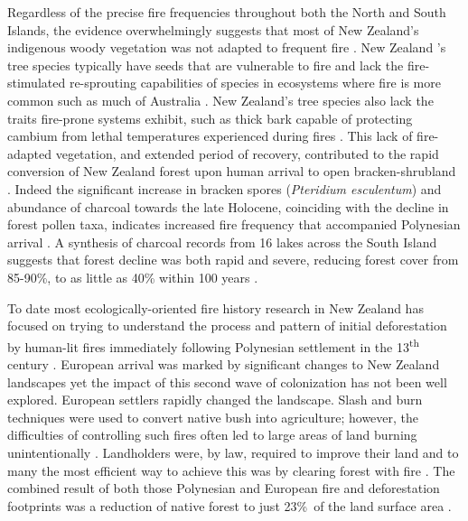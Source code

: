 \documentclass{article}
\begin{document}
Regardless of the precise fire frequencies throughout both the North and South Islands, the evidence overwhelmingly suggests that most of New Zealand's indigenous woody vegetation was not adapted to frequent fire \citep{Wilmshurst1996}. New Zealand 's tree species typically have seeds that are vulnerable to fire and lack the fire-stimulated re-sprouting capabilities of species in ecosystems where fire is more common such as much of Australia \citep{Perry2014}.  New Zealand's tree species also lack the traits fire-prone systems exhibit, such as thick bark capable of protecting cambium from lethal temperatures experienced during fires \citep{richardson2015functional}. This lack of fire-adapted vegetation, and extended period of recovery, contributed to the rapid conversion of New Zealand forest upon human arrival to open bracken-shrubland  \citep{McGlone1983}. Indeed the significant increase in bracken spores (\textit {Pteridium esculentum}) and abundance of charcoal towards the late Holocene, coinciding with the decline in forest pollen taxa, indicates increased fire frequency that accompanied Polynesian arrival \citep{McGlone1999}. A synthesis of charcoal records from 16 lakes across the South Island suggests that forest decline was both rapid and severe, reducing forest cover from 85-90\%, to as little as 40\% within 100 years \citep{McWethy2009a,mcwethy2014high}. 

To date most ecologically-oriented fire history research in New Zealand has focused on trying to understand the process and pattern of initial deforestation by human-lit fires immediately following Polynesian settlement in the 13\textsuperscript{th} century \citep { Perry2012a,Wilmshurst1996,McGlone1999,Wilmshurst2004,Wilmshurst2005,McWethy2009a}. European arrival was marked by significant changes to New Zealand landscapes yet the impact of this second wave of colonization has not been well explored.  European settlers rapidly changed the landscape. Slash and burn techniques were used to convert native bush into agriculture; however, the difficulties of controlling such fires often led to large areas of land burning unintentionally \citep{PawsonE}. Landholders were, by law, required to improve their land and to many the most efficient way to achieve this was by clearing forest with fire \citep{Salmon1975}. The combined result of both those Polynesian and European fire and deforestation footprints was a reduction of native forest to just 23\%\ of the land surface area \citep{Ewers2006}. 
\end{document}
